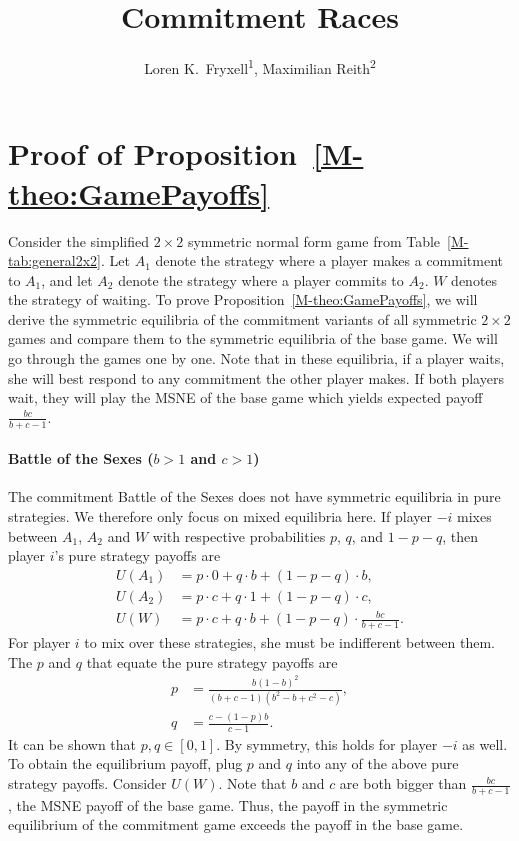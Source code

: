 \documentclass[letterpaper]{article}
\title{Commitment Races}
\author{
  Loren K.\ Fryxell\textsuperscript{\rm 1},
  Maximilian Reith\textsuperscript{\rm 2}
}
\newcommand{\bparam}{b}
\newcommand{\cparam}{c}
\theoremstyle{definition}
\begin{document}
\section{Proof of Proposition~\ref{M-theo:GamePayoffs}}\label{sec:prooftheo1}
Consider the simplified $2\times2$ symmetric normal form game from Table~\ref{M-tab:general2x2}.
Let $A_{1}$ denote the strategy where a player makes a commitment to $A_1$, and let $A_{2}$ denote the strategy where a player commits to $A_2$. $W$ denotes the strategy of waiting.
To prove Proposition~\ref{M-theo:GamePayoffs}, we will derive the symmetric equilibria of the commitment variants of all symmetric $2\times2$ games and compare them to the symmetric equilibria of the base game. We will go through the games one by one.
Note that in these equilibria, if a player waits, she will best respond to any commitment the other player makes. If both players wait, they will play the MSNE of the base game which yields expected payoff $\tfrac{\bparam\cparam}{\bparam+\cparam-1}$.


\paragraph{Battle of the Sexes ($\bparam>1$ and $\cparam>1$)}
The commitment Battle of the Sexes does not have symmetric equilibria in pure strategies. We therefore only focus on mixed equilibria here. %
If player $-i$ mixes between $A_1$, $A_2$ and $W$ with respective probabilities $p$, $q$, and $1-p-q$, then player $i$'s pure strategy payoffs are
\begin{align*}
U(A_1) &= p\cdot 0 + q\cdot \bparam + (1-p-q)\cdot \bparam,\\[0mm]
U(A_2) &= p\cdot \cparam + q\cdot 1 + (1-p-q)\cdot \cparam,\\[0mm]
U(W) &= p\cdot \cparam + q\cdot \bparam + (1-p-q)\cdot \tfrac{\bparam\cparam}{\bparam+\cparam-1}.
\end{align*}
For player $i$ to mix over these strategies, she must be indifferent between them. The $p$ and $q$ that equate the pure strategy payoffs are
\begin{align*}
    p &= \frac{\bparam(1-\bparam)^2}{(\bparam+\cparam-1)(\bparam^2-\bparam+\cparam^2-\cparam)},\\[6pt]
    q &= \frac{\cparam-(1-p)\bparam}{\cparam-1}.
\end{align*}
It can be shown that $p,q\in[0,1]$. By symmetry, this holds for player $-i$ as well. To obtain the equilibrium payoff, plug $p$ and $q$ into any of the above pure strategy payoffs. Consider $U(W)$.
Note that $\bparam$ and $\cparam$ are both bigger than $\tfrac{\bparam\cparam}{\bparam+\cparam-1}$, the MSNE payoff of the base game. Thus, the payoff in the symmetric equilibrium of the commitment game exceeds the payoff in the base game.
\end{document}

